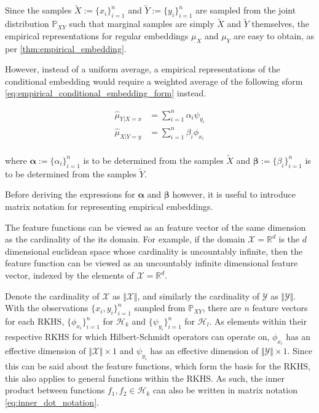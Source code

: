 \documentclass[twoside]{article} \usepackage{aistats2017}
\theoremstyle{definition}
\newcommand{\rv}[1]{{#1}}
\newcommand{\ds}[1]{\tilde{#1}}
\newcommand{\Hk}{\mathcal{H}_{k}}
\newcommand{\Hl}{\mathcal{H}_{l}}
\newcommand{\muX}{\mu_{\rv{X}}}
\newcommand{\muY}{\mu_{\rv{Y}}}
\newcommand{\hatmuYx}{\hat{\mu}_{\rv{Y} | \rv{X} = x}}
\newcommand{\hatmuXy}{\hat{\mu}_{\rv{X} | \rv{Y} = y}}
\newcommand{\cardX}{\Vert \mathcal{X} \Vert}
\newcommand{\cardY}{\Vert \mathcal{Y} \Vert}
\begin{document}
		Since the samples $\ds{X} := \{x_{i}\}_{i = 1}^{n}$ and $\ds{Y} := \{y_{i}\}_{i = 1}^{n}$ are sampled from the joint distribution $\mathbb{P}_{\rv{X} \rv{Y}}$ such that marginal samples are simply $\ds{X}$ and $\ds{Y}$ themselves, the empirical representations for regular embeddings $\muX$ and $\muY$ are easy to obtain, as per \cref{thm:empirical_embedding}.
		
		However, instead of a uniform average, a empirical representations of the conditional embedding would require a weighted average of the following sform \eqref{eq:empirical_conditional_embedding_form} instead.
		
		\begin{equation}
		\begin{aligned}
			\hatmuYx &= \sum_{i = 1}^{n} \alpha_{i} \psi_{y_{i}} \\
			\hatmuXy &= \sum_{i = 1}^{n} \beta_{i} \phi_{x_{i}} \\
		\label{eq:empirical_conditional_embedding_form}
		\end{aligned}
		\end{equation}
		
		where $\bm{\alpha} := \{\alpha_{i}\}_{i = 1}^{n}$ is to be determined from the samples $\ds{X}$ and $\bm{\beta} := \{\beta_{i}\}_{i = 1}^{n}$ is to be determined from the samples $\ds{Y}$.
		
		Before deriving the expressions for $\bm{\alpha}$ and $\bm{\beta}$ however, it is useful to introduce matrix notation for representing empirical embeddings.
		
		The feature functions can be viewed as an feature vector of the same dimension as the cardinality of the its domain. For example, if the domain $\mathcal{X} = \mathbb{R}^{d}$ is the $d$ dimensional euclidean space whose cardinality is uncountably infinite, then the feature function can be viewed as an uncountably infinite dimensional feature vector, indexed by the elements of $\mathcal{X} = \mathbb{R}^{d}$.
		
		Denote the cardinality of $\mathcal{X}$ as $\cardX$, and similarly the cardinality of $\mathcal{Y}$ as $\cardY$. With the observations $\{x_{i}, y_{i}\}_{i = 1}^{n}$ sampled from $\mathbb{P}_{\rv{X} \rv{Y}}$, there are $n$ feature vectors for each RKHS, $\{\phi_{x_{i}}\}_{i = 1}^{n}$ for $\Hk$ and $\{\psi_{y_{i}}\}_{i = 1}^{n}$ for $\Hl$. As elements within their respective RKHS for which Hilbert-Schmidt operators can operate on, $\phi_{x_{i}}$ has an effective dimension of $\cardX \times 1$ and $\psi_{y_{i}}$ has an effective dimension of $\cardY \times 1$. Since this can be said about the feature functions, which form the basis for the RKHS, this also applies to general functions within the RKHS. As such, the inner product between functions $f_{1}, f_{2} \in \Hk$ can also be written in matrix notation \eqref{eq:inner_dot_notation}.
		
\end{document}
